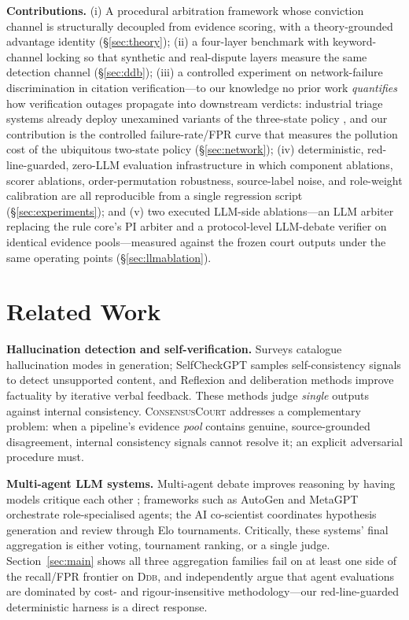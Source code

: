 \documentclass[11pt]{article}
\newcommand{\court}{\textsc{ConsensusCourt}}
\newcommand{\ddb}{\textsc{Ddb}}
\begin{document}
\textbf{Contributions.}
(i) A procedural arbitration framework whose conviction channel is
structurally decoupled from evidence scoring, with a theory-grounded
advantage identity (\S\ref{sec:theory});
(ii) a four-layer benchmark with keyword-channel locking so that synthetic
and real-dispute layers measure the same detection channel
(\S\ref{sec:ddb});
(iii) a controlled experiment on network-failure discrimination in citation
verification—to our knowledge no prior work \emph{quantifies} how
verification outages propagate into downstream verdicts: industrial triage
systems already deploy unexamined variants of the three-state policy
\citep{gptzero2026hallucination}, and our contribution is the controlled
failure-rate/FPR curve that measures the pollution cost of the ubiquitous
two-state policy (\S\ref{sec:network});
(iv) deterministic, red-line-guarded, zero-LLM evaluation infrastructure in
which component ablations, scorer ablations, order-permutation robustness,
source-label noise, and role-weight calibration are all reproducible from a
single regression script (\S\ref{sec:experiments}); and (v) two executed
LLM-side ablations—an LLM arbiter replacing the rule core's PI arbiter and
a protocol-level LLM-debate verifier on identical evidence pools—measured
against the frozen court outputs under the same operating points
(\S\ref{sec:llmablation}).

\section{Related Work}\label{sec:related}

\textbf{Hallucination detection and self-verification.}
Surveys \citep{ji2023hallucination} catalogue hallucination modes in
generation; SelfCheckGPT \citep{manakul2023selfcheckgpt} samples
self-consistency signals to detect unsupported content, and Reflexion
\citep{shinn2023reflexion} and deliberation methods
\citep{yao2023tree} improve factuality by iterative verbal feedback. These
methods judge \emph{single} outputs against internal consistency.
\court{} addresses a complementary problem: when a pipeline's evidence
\emph{pool} contains genuine, source-grounded disagreement, internal
consistency signals cannot resolve it; an explicit adversarial procedure
must.

\textbf{Multi-agent LLM systems.}
Multi-agent debate improves reasoning by having models critique each other
\citep{du2023debate}; frameworks such as AutoGen \citep{wu2023autogen} and
MetaGPT \citep{hong2023metagpt} orchestrate role-specialised agents; the AI
co-scientist \citep{gottweis2025coscientist} coordinates hypothesis
generation and review through Elo tournaments. Critically, these systems'
final aggregation is either voting, tournament ranking, or a single judge.
Section~\ref{sec:main} shows all three aggregation families fail on at
least one side of the recall/FPR frontier on \ddb{}, and
\citet{kapoor2024agents} independently argue that agent evaluations are
dominated by cost- and rigour-insensitive methodology—our red-line-guarded
deterministic harness is a direct response.
\end{document}
